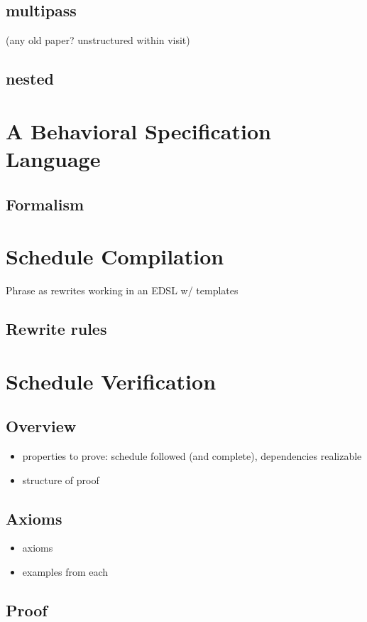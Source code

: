 \subsection{multipass} (any old paper? unstructured within visit)
\subsection{nested}

\section{A Behavioral Specification Language}
\subsection{Formalism}

\section{Schedule Compilation}
Phrase as rewrites working in an EDSL w/ templates
\subsection{Rewrite rules}
\section{Schedule Verification}
\subsection{Overview}
\begin{itemize}
\item properties to prove: schedule followed (and complete), dependencies realizable 
\item structure of proof
\end{itemize}
\subsection{Axioms}
\begin{itemize}
\item axioms
\item examples from each
\end{itemize}
\subsection{Proof}

